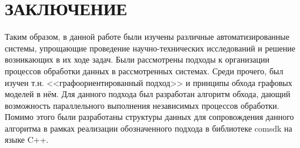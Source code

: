\chapter*{ЗАКЛЮЧЕНИЕ}\label{chap_conclusion}
Таким образом, в данной работе были изучены различные автоматизированные системы, упрощающие проведение научно-технических исследований и решение возникающих в их ходе задач. Были рассмотрены подходы к организации процессов обработки данных в рассмотренных системах. Среди прочего, был изучен т.н. <<графоориентированный подход>> и принципы обхода графовых моделей в нём. Для данного подхода был разработан алгоритм обхода, дающий возможность параллельного выполнения независимых процессов обработки. Помимо этого были разработаны структуры данных для сопровождения данного алгоритма в рамках реализации обозначенного подхода в библиотеке comsdk на языке C++.
